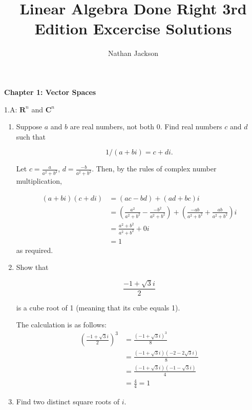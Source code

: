 \documentclass{book}
\title{Linear Algebra Done Right 3rd Edition Excercise Solutions}
\author{Nathan Jackson}
\begin{document}
{\huge \textbf{Chapter 1: Vector Spaces}}

1.A: \(\textbf{R}^n\) and \(\textbf{C}^n\)

\begin{enumerate}

\item Suppose \(a\) and \(b\) are real numbers, not both 0.  Find real numbers \(c\) and \(d\) such that 

\begin{equation*}
    1/(a+bi) = c+di.
\end{equation*}

Let \(c = \frac{a}{a^2+b^2}\), \(d = \frac{-b}{a^2+b^2}\).  Then, by the rules of complex number multiplication,

\begin{equation*}
\begin{split}
(a+bi)(c+di)&=(ac-bd)+(ad+bc)i \\
&=(\frac{a^2}{a^2+b^2}-\frac{-b^2}{a^2+b^2})+(\frac{-ab}{a^2+b^2}+\frac{ab}{a^2+b^2})i \\
&= \frac{a^2+b^2}{a^2+b^2} +0i \\
&=1
\end{split}
\end{equation*}
as required.

\item Show that 

\begin{equation*}
    \frac{-1+\sqrt{3}i}{2}
\end{equation*}

is a cube root of 1 (meaning that its cube equals 1).

The calculation is as follows:
\begin{equation*}
\begin{split}
(\frac{-1+\sqrt{3}i}{2})^3 & = \frac{(-1+\sqrt{3}i)^3}{8} \\
& = \frac{(-1+\sqrt{3}i)(-2-2\sqrt{3}i)}{8} \\
& = \frac{(-1+\sqrt{3}i)(-1-\sqrt{3}i)}{4} \\
& = \frac{4}{4} = 1
\end{split}
\end{equation*}

\item Find two distinct square roots of \(i\).


\end{enumerate}
\end{document}
